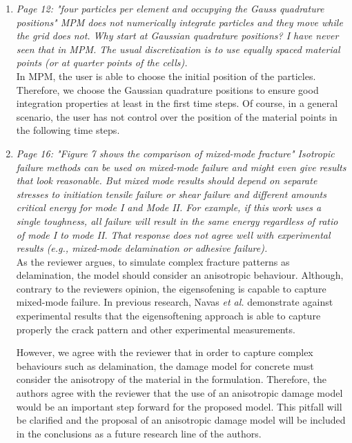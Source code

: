 \documentclass[12pt]{article}
\begin{document}
\begin{enumerate}
\item \textit{Page 12: "four particles per element and occupying the Gauss quadrature positions" MPM does not numerically integrate particles and they move while the grid does not. Why start at Gaussian quadrature positions? I have never seen that in MPM. The usual discretization is to use equally spaced material points (or at quarter points of the cells).}\\

In MPM, the user is able to choose the initial position of the particles. Therefore, we choose the Gaussian quadrature positions to ensure good integration properties at least in the first time steps. Of course, in a general scenario, the user has not control over the position of the material points in the following time steps. 
   
\item \textit{Page 16: "Figure 7 shows the comparison of mixed-mode fracture"
Isotropic failure methods can be used on mixed-mode failure and might even give results that look reasonable. But mixed mode results should depend on separate stresses to initiation tensile failure or shear failure and different amounts critical energy for mode I and Mode II. For example, if this work uses a single toughness, all failure will result in the same energy regardless of ratio of mode I to mode II. That response does not agree well with experimental results (e.g., mixed-mode delamination or adhesive failure).}\\

As the reviewer argues, to simulate complex fracture patterns as delamination, the model should consider an anisotropic behaviour. Although, contrary to the reviewer\textquotesingle s opinion, the eigensofening is capable to capture mixed-mode failure. In previous research, Navas {\it et al.}  \cite{Navas_2018b} demonstrate against experimental results that the eigensoftening approach is able to capture properly the crack pattern and other experimental measurements. 

However, we agree with the reviewer that in order to capture complex behaviours such as delamination, the damage model for concrete must consider the anisotropy of the material in the formulation. Therefore, the authors agree with the reviewer that the use of an anisotropic damage model would be an important step forward for the proposed model. This pitfall will be clarified and the proposal of an anisotropic damage model will be included in the conclusions as a future research line of the authors.


\end{enumerate}
\end{document}
